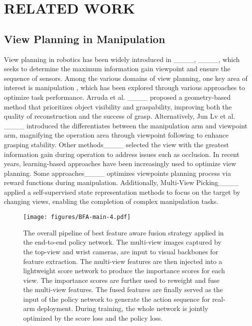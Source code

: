 \section{RELATED WORK}
\subsection{View Planning in Manipulation}

View planning in robotics has been widely introduced in ____, ____, which seeks to determine the maximum information gain viewpoint and ensure the sequence of sensors. Among the various domains of view planning, one key area of interest is manipulation , which has been explored through various approaches to optimize task performance.
Arruda et al. ____ proposed a geometry-based method that prioritizes object visibility and graspability, improving both the quality of reconstruction and the success of grasp. Alternatively, Jun Lv et al. ____ introduced the differentiates between the manipulation arm and viewpoint arm, magnifying the operation area through viewpoint following to enhance grasping stability. 
Other methods____ selected the view with the greatest information gain during operation to address issues such as occlusion.
In recent years, learning-based approaches have been increasingly used to optimize view planning. Some approaches____ optimizes viewpoints planning process via reward functions during manipulation.
Additionally, Multi-View Picking____ applied a self-supervised state representation methods to focus on the target by changing views, enabling the completion of complex manipulation tasks.


\begin{figure*}[htbp]
    \centering
    \texttt{[image: figures/BFA-main-4.pdf]}
    \vspace{-0.8cm}
    \caption{The overall pipeline of best feature aware fusion strategy applied in the end-to-end policy network. The multi-view images captured by the top-view and wrist cameras, are input to visual backbones for feature extraction. The multi-view features are then injected into a lightweight score network to produce the importance scores for each view. The importance scores are further used to reweight and fuse the multi-view features. The fused features are finally served as the input of the policy network to generate the action sequence for real-arm deployment. During training, the whole network is jointly optimized by the score loss and the policy loss.}
    \label{fig:BFA-main}
\end{figure*}



